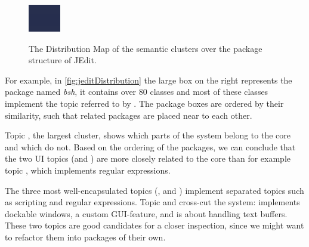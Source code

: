 \begin{figure}[h]
  \centering
  \includegraphics[width=\linewidth]{jeditDistribution}\\
  \caption{The Distribution Map of the semantic clusters over the package structure of JEdit.}\label{fig:jeditDistribution}
\end{figure}


For example, in \autoref{fig:jeditDistribution} the large box on the right represents the package named \emph{bsh}, it contains over 80 classes and most of these classes implement the topic referred to by \blue. The package boxes are ordered by their similarity, such that related packages are placed near to each other.

Topic \red, the largest cluster, shows which parts of the system belong to the core and which do not. Based on the ordering of the packages, we can conclude that the two UI topics (\eg \green and \yellow) are more closely related to the core than for example topic \cyan, which implements regular expressions.

The three most well-encapsulated topics (\eg \orange, \blue and \cyan) implement separated topics such as scripting and regular expressions. Topic \yellow and \pink cross-cut the system: \yellow implements dockable windows, a custom GUI-feature, and \pink is about handling text buffers. These two topics are good candidates for a closer inspection, since we might want to refactor them into packages of their own.

